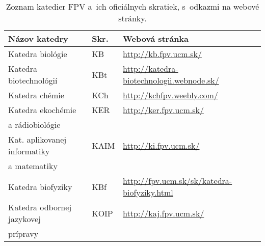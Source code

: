 \begin{table}
  \centering\small
  \caption[Zoznam katedier FPV]%
  {Zoznam katedier FPV a~ich oficiálnych skratiek, s~odkazmi na webové stránky.}
  \label{tab:department.review}
  \begin{tabularx}{\textwidth}{lll}
    \toprule
    Názov katedry & Skr. & Webová stránka \\
    \midrule
    Katedra biológie             & KB   & {\footnotesize \url{http://kb.fpv.ucm.sk/}}                       \\[0.5ex]
    Katedra biotechnológií       & KBt  & {\footnotesize \url{http://katedra-biotechnologii.webnode.sk/}}   \\[0.5ex]
    Katedra chémie               & KCh  & {\footnotesize \url{http://kchfpv.weebly.com/}}                   \\[0.5ex]
    Katedra ekochémie            & KER  & {\footnotesize \url{http://ker.fpv.ucm.sk/}}                      \\[-0.25ex]
    a rádiobiológie              &      &                                                                   \\[0.5ex]
    Kat. aplikovanej informatiky & KAIM & {\footnotesize \url{http://ki.fpv.ucm.sk/}}                       \\[-0.25ex]
    a matematiky                 &      &                                                                   \\[0.5ex]
    Katedra biofyziky            & KBf  & {\footnotesize \url{http://fpv.ucm.sk/sk/katedra-biofyziky.html}} \\[0.5ex]
    Katedra odbornej jazykovej   & KOIP & {\footnotesize \url{http://kaj.fpv.ucm.sk/}}                      \\[-0.25ex]
    prípravy                     &      &                                                                   \\
    \bottomrule
  \end{tabularx}
\end{table}

